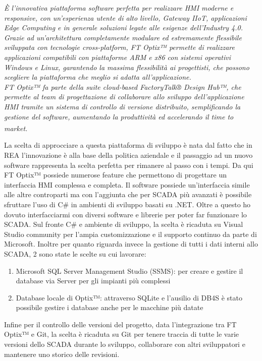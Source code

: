 \begin{displayquote}
    \textit{È l’innovativa piattaforma software perfetta per realizzare HMI moderne e responsive, con un’esperienza utente di alto livello, Gateway IIoT, applicazioni Edge Computing e in generale soluzioni legate alle esigenze dell’Industry 4.0.} \\ \textit{Grazie ad un’architettura completamente modulare ed estremamente flessibile sviluppata con tecnologie cross-platform, FT Optix™ permette di realizzare applicazioni compatibili con piattaforme ARM e x86 con sistemi operativi Windows e Linux, garantendo la massima flessibilità ai progettisti, che possono scegliere la piattaforma che meglio si adatta all’applicazione.} \\ \textit{FT Optix™ fa parte della suite cloud-based FactoryTalk® Design Hub™, che permette al team di progettazione di collaborare allo sviluppo dell’applicazione HMI tramite un sistema di controllo di versione distribuito, semplificando la gestione del software, aumentando la produttività ed accelerando il time to market.}\textsuperscript{\cite{asemautomation}}
\end{displayquote}

La scelta di approcciare a questa piattaforma di sviluppo è nata dal fatto che in REA l'innovazione è alla base della politica aziendale e il passaggio ad un nuovo software rappresenta la scelta perfetta per rimanere al passo con i tempi. Da qui FT Optix™ possiede numerose feature che permettono di progettare un interfaccia HMI complessa e completa. Il software possiede un'interfaccia simile alle altre controparti ma con l'aggiunta che per SCADA più avanzati è possibile sfruttare l'uso di C\# in ambienti di sviluppo basati su .NET. Oltre a questo ho dovuto interfacciarmi con diversi software e librerie per poter far funzionare lo SCADA. 
Sul fronte C\# e ambiente di sviluppo, la scelta è ricaduta su Visual Studio community per l'ampia customizzazione e il supporto continuo da parte di Microsoft. Inoltre per quanto riguarda invece la gestione di tutti i dati interni allo SCADA, 2 sono state le scelte su cui lavorare:
\begin{enumerate}
    \item Microsoft SQL Server Management Studio (SSMS): per creare e gestire il database via Server per gli impianti più complessi
    \item Database locale di Optix™: attraverso SQLite e l'ausilio di DB4S è stato possibile gestire i database anche per le macchine più datate
\end{enumerate}
Infine per il controllo delle versioni del progetto, data l'integrazione tra FT Optix™ e Git, la scelta è ricaduta su Git per tenere traccia di tutte le varie versioni dello SCADA durante lo sviluppo, collaborare con altri sviluppatori e mantenere uno storico delle revisioni. 

